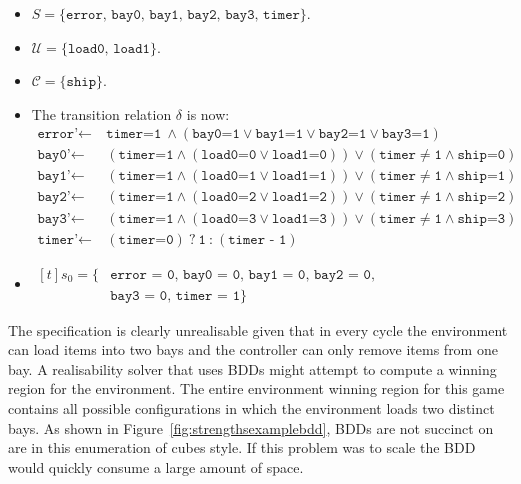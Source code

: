 \begin{itemize}
    \item $S = \{ \texttt{error, bay0, bay1, bay2, bay3, timer} \} $.
    \item $\mathcal{U} = \{ \texttt{load0, load1} \} $. 
    \item $\mathcal{C} = \{ \texttt{ship} \}$.
    \item The transition relation $\delta$ is now: 
        \begin{align*}
            \texttt{error'} \gets&\ \texttt{timer=1}\ \land (\texttt{bay0=1} \lor \texttt{bay1=1} \lor \texttt{bay2=1} \lor \texttt{bay3=1} ) \\
            \texttt{bay0'} \gets&\ (\texttt{timer=1} \land (\texttt{load0=0} \lor \texttt{load1=0})) \lor (\texttt{timer}\neq\texttt{1} \land \texttt{ship=0}) \\
            \texttt{bay1'} \gets&\ (\texttt{timer=1} \land (\texttt{load0=1} \lor \texttt{load1=1})) \lor (\texttt{timer}\neq\texttt{1} \land \texttt{ship=1}) \\
            \texttt{bay2'} \gets&\ (\texttt{timer=1} \land (\texttt{load0=2} \lor \texttt{load1=2})) \lor (\texttt{timer}\neq\texttt{1} \land \texttt{ship=2}) \\
            \texttt{bay3'} \gets&\ (\texttt{timer=1} \land (\texttt{load0=3} \lor \texttt{load1=3})) \lor (\texttt{timer}\neq\texttt{1} \land \texttt{ship=3}) \\
            \texttt{timer'} \gets&\ (\texttt{timer=0})\ \texttt{?}\ \texttt{1}\ \texttt{:}\ (\texttt{timer - 1})
        \end{align*}
    \item $\begin{aligned}[t]
            s_0 = \{& \texttt{error = 0, bay0 = 0, bay1 = 0, bay2 = 0,} \\
                    &\texttt{bay3 = 0, timer = 1} \}
        \end{aligned}$
\end{itemize}

The specification is clearly unrealisable given that in every cycle the environment can load items into two bays and the controller can only remove items from one bay. A realisability solver that uses BDDs might attempt to compute a winning region for the environment. The entire environment winning region for this game contains all possible configurations in which the environment loads two distinct bays. As shown in Figure~\ref{fig:strengthsexamplebdd}, BDDs are not succinct on are in this enumeration of cubes style. If this problem was to scale the BDD would quickly consume a large amount of space.

